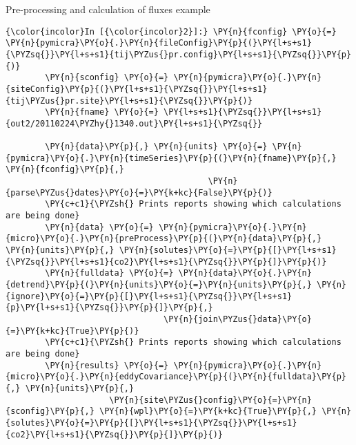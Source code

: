 \begin{exampleblock}{Pre-processing and calculation of fluxes example}
    \begin{Verbatim}[commandchars=\\\{\}]
{\color{incolor}In [{\color{incolor}2}]:} \PY{n}{fconfig} \PY{o}{=} \PY{n}{pymicra}\PY{o}{.}\PY{n}{fileConfig}\PY{p}{(}\PY{l+s+s1}{\PYZsq{}}\PY{l+s+s1}{tij\PYZus{}pr.config}\PY{l+s+s1}{\PYZsq{}}\PY{p}{)}
        \PY{n}{sconfig} \PY{o}{=} \PY{n}{pymicra}\PY{o}{.}\PY{n}{siteConfig}\PY{p}{(}\PY{l+s+s1}{\PYZsq{}}\PY{l+s+s1}{tij\PYZus{}pr.site}\PY{l+s+s1}{\PYZsq{}}\PY{p}{)}
        \PY{n}{fname} \PY{o}{=} \PY{l+s+s1}{\PYZsq{}}\PY{l+s+s1}{out2/20110224\PYZhy{}1340.out}\PY{l+s+s1}{\PYZsq{}}
        
        \PY{n}{data}\PY{p}{,} \PY{n}{units} \PY{o}{=} \PY{n}{pymicra}\PY{o}{.}\PY{n}{timeSeries}\PY{p}{(}\PY{n}{fname}\PY{p}{,} \PY{n}{fconfig}\PY{p}{,}
                                         \PY{n}{parse\PYZus{}dates}\PY{o}{=}\PY{k+kc}{False}\PY{p}{)}
        \PY{c+c1}{\PYZsh{} Prints reports showing which calculations are being done}
        \PY{n}{data} \PY{o}{=} \PY{n}{pymicra}\PY{o}{.}\PY{n}{micro}\PY{o}{.}\PY{n}{preProcess}\PY{p}{(}\PY{n}{data}\PY{p}{,} \PY{n}{units}\PY{p}{,} \PY{n}{solutes}\PY{o}{=}\PY{p}{[}\PY{l+s+s1}{\PYZsq{}}\PY{l+s+s1}{co2}\PY{l+s+s1}{\PYZsq{}}\PY{p}{]}\PY{p}{)}
        \PY{n}{fulldata} \PY{o}{=} \PY{n}{data}\PY{o}{.}\PY{n}{detrend}\PY{p}{(}\PY{n}{units}\PY{o}{=}\PY{n}{units}\PY{p}{,} \PY{n}{ignore}\PY{o}{=}\PY{p}{[}\PY{l+s+s1}{\PYZsq{}}\PY{l+s+s1}{p}\PY{l+s+s1}{\PYZsq{}}\PY{p}{]}\PY{p}{,}
                                \PY{n}{join\PYZus{}data}\PY{o}{=}\PY{k+kc}{True}\PY{p}{)}
        \PY{c+c1}{\PYZsh{} Prints reports showing which calculations are being done}
        \PY{n}{results} \PY{o}{=} \PY{n}{pymicra}\PY{o}{.}\PY{n}{micro}\PY{o}{.}\PY{n}{eddyCovariance}\PY{p}{(}\PY{n}{fulldata}\PY{p}{,} \PY{n}{units}\PY{p}{,} 
                     \PY{n}{site\PYZus{}config}\PY{o}{=}\PY{n}{sconfig}\PY{p}{,} \PY{n}{wpl}\PY{o}{=}\PY{k+kc}{True}\PY{p}{,} \PY{n}{solutes}\PY{o}{=}\PY{p}{[}\PY{l+s+s1}{\PYZsq{}}\PY{l+s+s1}{co2}\PY{l+s+s1}{\PYZsq{}}\PY{p}{]}\PY{p}{)}
\end{Verbatim}


\end{exampleblock}

    
